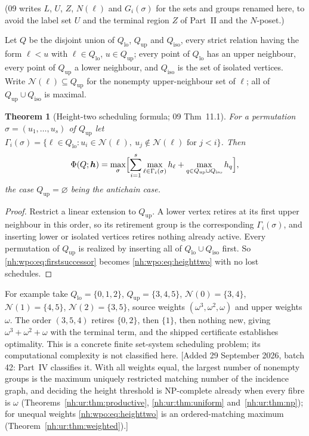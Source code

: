 \documentclass[11pt,a4paper]{article}
\newtheorem{theorem}{Theorem}[section]
\theoremstyle{definition}
\theoremstyle{remark}
\begin{document}
(09 writes $L$, $U$, $Z$, $N(\ell)$ and $G_i(\sigma)$ for the sets and
groups renamed here, to avoid the label set $U$ and the terminal region $Z$
of Part~II and the $N$-poset.)

Let $Q$ be the disjoint union of $Q_{\mathrm{lo}}$, $Q_{\mathrm{up}}$ and $Q_{\mathrm{iso}}$, every strict relation having
the form $\ell<u$ with $\ell\in Q_{\mathrm{lo}}$, $u\in Q_{\mathrm{up}}$; every point of $Q_{\mathrm{lo}}$ has an upper
neighbour, every point of $Q_{\mathrm{up}}$ a lower neighbour, and $Q_{\mathrm{iso}}$ is the set of isolated
vertices. Write $\mathcal N(\ell)\subseteq Q_{\mathrm{up}}$ for the nonempty upper-neighbour
set of $\ell$; all of $Q_{\mathrm{up}}\cup Q_{\mathrm{iso}}$ is maximal.

\begin{theorem}[Height-two scheduling formula; 09 Thm~11.1]\label{nh:wpo:thm:heighttwo}
For a permutation $\sigma=(u_1,\dots,u_s)$ of $Q_{\mathrm{up}}$ let
$\Gamma_i(\sigma)=\{\ell\in Q_{\mathrm{lo}}:u_i\in\mathcal N(\ell),\ u_j\notin\mathcal N(\ell)
\text{ for }j<i\}$. Then
\begin{equation}\label{nh:wpo:eq:heighttwo}
 \Phi(Q;\boldsymbol h)=\max_\sigma\Bigl[\sum_{i=1}^s\max_{\ell\in\Gamma_i(\sigma)}h_\ell
 +\max_{q\in Q_{\mathrm{up}}\cup Q_{\mathrm{iso}}}h_q\Bigr],
\end{equation}
the case $Q_{\mathrm{up}}=\varnothing$ being the antichain case.
\end{theorem}
\begin{proof}
Restrict a linear extension to $Q_{\mathrm{up}}$. A lower vertex retires at its first upper
neighbour in this order, so its retirement group is the corresponding
$\Gamma_i(\sigma)$, and inserting lower or isolated vertices retires nothing already
active. Every permutation of $Q_{\mathrm{up}}$ is realized by inserting all of $Q_{\mathrm{lo}}\cup Q_{\mathrm{iso}}$ first.
So \eqref{nh:wpo:eq:firstsuccessor} becomes \eqref{nh:wpo:eq:heighttwo} with no lost
schedules.
\end{proof}

For example take $Q_{\mathrm{lo}}=\{0,1,2\}$, $Q_{\mathrm{up}}=\{3,4,5\}$,
$\mathcal N(0)=\{3,4\}$, $\mathcal N(1)=\{4,5\}$, $\mathcal N(2)=\{3,5\}$, source
weights $(\omega^3,\omega^2,\omega)$ and upper weights $\omega$. The order
$(3,5,4)$ retires $\{0,2\}$, then $\{1\}$, then nothing new, giving
$\omega^3+\omega^2+\omega$ with the terminal term, and the shipped certificate
 establishes
optimality. This is a concrete finite set-system scheduling problem; its
computational complexity is not classified here.
[Added 29 September 2026, batch 42: Part~IV classifies it. With all weights
equal, the largest number of nonempty groups is the maximum uniquely
restricted matching number of the incidence graph, and deciding the height
threshold is NP-complete already when every fibre is $\omega$
(Theorems~\ref{nh:ur:thm:productive}, \ref{nh:ur:thm:uniform}
and~\ref{nh:ur:thm:np}); for unequal weights \eqref{nh:wpo:eq:heighttwo} is
an ordered-matching maximum (Theorem~\ref{nh:ur:thm:weighted}).]
\end{document}
